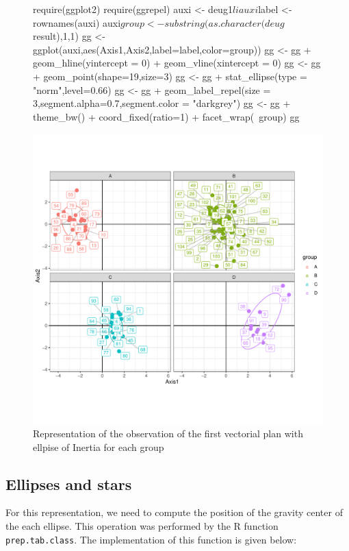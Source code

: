 \documentclass[a4paper,10pt]{article}
\begin{document}
\begin{figure}[H]
\begin{center}
\begin{Schunk}
\begin{Sinput}
  require(ggplot2)
  require(ggrepel)
  auxi <- deug1$li
  auxi$label <- rownames(auxi)
  auxi$group <- substring(as.character(deug$result),1,1)
  gg <- ggplot(auxi,aes(Axis1,Axis2,label=label,color=group))
  gg <- gg + geom_hline(yintercept = 0) + geom_vline(xintercept = 0)
  gg <- gg + geom_point(shape=19,size=3)
  gg <- gg + stat_ellipse(type = "norm",level=0.66)
  gg <- gg + geom_label_repel(size = 3,segment.alpha=0.7,segment.color = "darkgrey")
  gg <-  gg + theme_bw() + coord_fixed(ratio=1) + facet_wrap(~group)
  gg
\end{Sinput}
\end{Schunk}
\includegraphics{figs/sweave-liclass4}
\caption{Representation of the observation of the first vectorial plan with ellpise of Inertia for each group}
\label{fig:liclass4}
\end{center}
\end{figure}

\subsection{Ellipses and stars}
For this representation, we need to compute the position of the gravity center of the each ellipse. This operation was performed by the R function \texttt{prep.tab.class}. The implementation of this function is given below:
\end{document}
